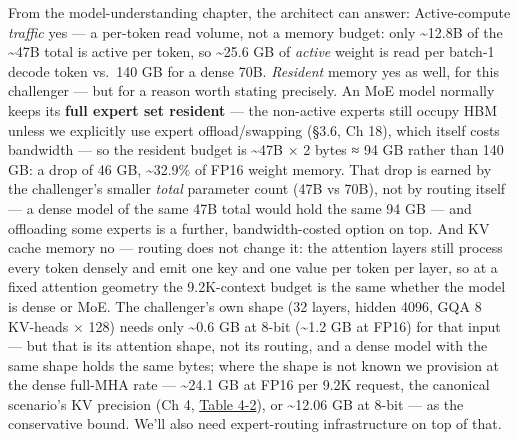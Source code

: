 From the model-understanding chapter, the architect can answer:
Active-compute \emph{traffic} yes --- a per-token read volume, not a
memory budget: only \textasciitilde12.8B of the \textasciitilde47B total
is active per token, so \textasciitilde25.6 GB of \emph{active} weight
is read per batch-1 decode token vs.~140 GB for a dense 70B.
\emph{Resident} memory yes as well, for this challenger --- but for a
reason worth stating precisely. An MoE model normally keeps its
\textbf{full expert set resident} --- the non-active experts still
occupy HBM unless we explicitly use expert offload/swapping (§3.6, Ch
18), which itself costs bandwidth --- so the resident budget is
\textasciitilde47B × 2 bytes ≈ 94 GB rather than 140 GB: a drop of 46
GB, \textasciitilde32.9\% of FP16 weight memory. That drop is earned by
the challenger's smaller \emph{total} parameter count (47B vs 70B), not
by routing itself --- a dense model of the same 47B total would hold the
same 94 GB --- and offloading some experts is a further,
bandwidth-costed option on top. And KV cache memory no --- routing does
not change it: the attention layers still process every token densely
and emit one key and one value per token per layer, so at a fixed
attention geometry the 9.2K-context budget is the same whether the model
is dense or MoE. The challenger's own shape (32 layers, hidden 4096, GQA
8 KV-heads × 128) needs only \textasciitilde0.6 GB at 8-bit
(\textasciitilde1.2 GB at FP16) for that input --- but that is its
attention shape, not its routing, and a dense model with the same shape
holds the same bytes; where the shape is not known we provision at the
dense full-MHA rate --- \textasciitilde24.1 GB at FP16 per 9.2K request,
the canonical scenario's KV precision (Ch 4, \hyperref[tab:4.2]{Table 4-2}), or
\textasciitilde12.06 GB at 8-bit --- as the conservative bound. We'll
also need expert-routing infrastructure on top of that.

